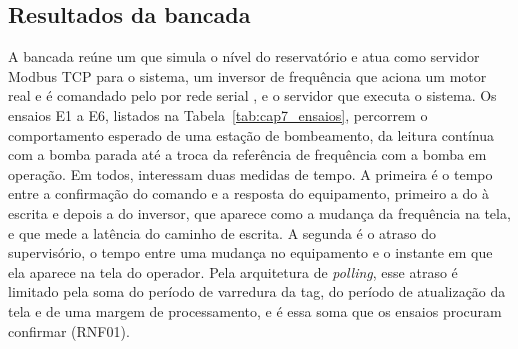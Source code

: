 \subsection{Resultados da bancada}

\par A bancada reúne um  que simula o nível do reservatório e atua como servidor Modbus TCP para o sistema, um inversor de frequência que aciona um motor real e é comandado pelo  por rede serial \cite{SCHNEIDER_ATV320_MODBUS_MANUAL}, e o servidor que executa o sistema. Os ensaios E1 a E6, listados na Tabela~\ref{tab:cap7_ensaios}, percorrem o comportamento esperado de uma estação de bombeamento, da leitura contínua com a bomba parada até a troca da referência de frequência com a bomba em operação. Em todos, interessam duas medidas de tempo. A primeira é o tempo entre a confirmação do comando e a resposta do equipamento, primeiro a do  à escrita e depois a do inversor, que aparece como a mudança da frequência na tela, e que mede a latência do caminho de escrita. A segunda é o atraso do supervisório, o tempo entre uma mudança no equipamento e o instante em que ela aparece na tela do operador. Pela arquitetura de \emph{polling}, esse atraso é limitado pela soma do período de varredura da tag, do período de atualização da tela e de uma margem de processamento, e é essa soma que os ensaios procuram confirmar (RNF01).


